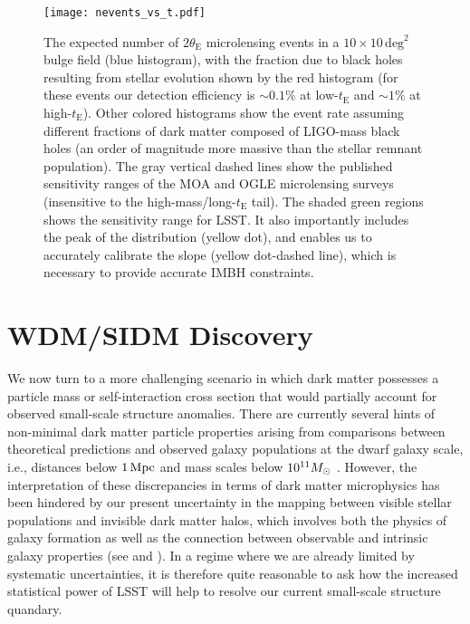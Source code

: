 \begin{figure}[t]
\centering
\texttt{[image: nevents\_vs\_t.pdf]}
\caption{
    \label{fig:macho_discovery}
    The expected number of $2\theta_\mathrm{E}$ microlensing events in a $10\times10\,\mathrm{deg}^2$ bulge field (blue histogram), with the fraction due to black holes resulting from stellar evolution shown by the red histogram (for these events our detection efficiency is $\sim0.1\%$ at low-$t_\mathrm{E}$ and $\sim1\%$ at high-$t_\mathrm{E}$).
    Other colored histograms show the event rate assuming different fractions of dark matter composed of LIGO-mass black holes (an order of magnitude more massive than the stellar remnant population).
    The gray vertical dashed lines show the published sensitivity ranges of the MOA and OGLE microlensing surveys (insensitive to the high-mass/long-$t_\mathrm{E}$ tail).
    The shaded green regions shows the sensitivity range for LSST.
    It also importantly includes the peak of the distribution (yellow dot), and enables us to accurately calibrate the slope (yellow dot-dashed line), which is necessary to provide accurate IMBH constraints.
    }
\end{figure}

\section{WDM/SIDM Discovery}

We now turn to a more challenging scenario in which dark matter possesses a particle mass or self-interaction cross section that would partially account for observed small-scale structure anomalies.
There are currently several hints of non-minimal dark matter particle properties arising from comparisons between theoretical predictions and observed galaxy populations at the dwarf galaxy scale, i.e., distances below $1 \mathrm{\,Mpc}$ and mass scales below $10^{11} M_\odot$ \citep[reviewed by][]{BuckleyPeter:2017,Bullock:2017xww}.
However, the interpretation of these discrepancies in terms of dark matter microphysics has been hindered by our present uncertainty in the mapping between visible stellar populations and invisible dark matter halos, which involves both the physics of galaxy formation as well as the connection between observable and intrinsic galaxy properties (see  and ).
In a regime where we are already limited by systematic uncertainties, it is therefore quite reasonable to ask how the increased statistical power of LSST will help to resolve our current small-scale structure quandary.

